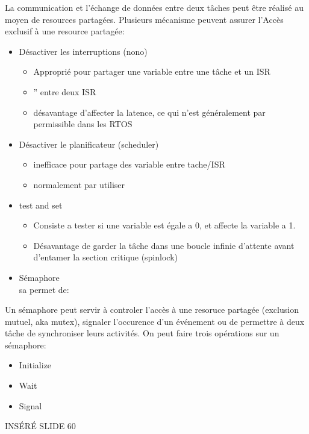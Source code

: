 \documentclass[oneside]{book}
\begin{document}
    La communication et l'échange de données entre deux tâches peut être réalisé au moyen de resources partagées. Plusieurs mécanisme peuvent assurer l'Accès exclusif à une resource partagée:
    \begin{itemize}
        \item Désactiver les interruptions (nono)
        \begin{itemize}
            \item Approprié pour partager une variable entre une tâche et un ISR
            \item '' entre deux ISR
            \item désavantage d'affecter la latence, ce qui n'est généralement par permissible dans les RTOS
        \end{itemize}
        \item Désactiver le planificateur (scheduler)
        \begin{itemize}
            \item inefficace pour partage des variable entre tache/ISR
            \item normalement par utiliser
        \end{itemize}
        \item test and set
        \begin{itemize}
            \item Consiste a tester si une variable est égale a 0, et affecte la variable a 1.
            \item Désavantage de garder la tâche dans une boucle infinie d'attente avant d'entamer la section critique (spinlock)
        \end{itemize}
        \item Sémaphore\\
        sa permet de:
      
    \end{itemize}

    Un sémaphore peut servir à controler l'accès à une resoruce partagée (exclusion mutuel, aka mutex), signaler l'occurence d'un événement ou de permettre à deux tâche de synchroniser leurs activités. On peut faire trois opérations sur un sémaphore:
    \begin{itemize}
        \item Initialize
        \item Wait
        \item Signal
    \end{itemize} 

    INSÉRÉ SLIDE 60
    \\
    
\end{document}
